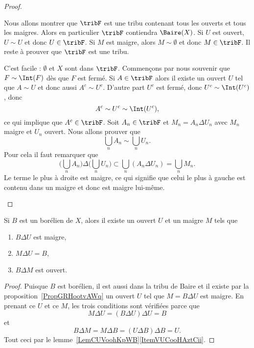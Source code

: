 \begin{proof}
\begin{subproof}
		Nous allons montrer que \( \tribF\) est une tribu contenant tous les ouverts et tous les maigres. Alors en particulier \( \tribF\) contiendra \( \Baire(X)\). Si \( U\) est ouvert, \( U\sim U\) et donc \( U\in\tribF\). Si \( M \) est maigre, alors \( M\sim\emptyset\) et donc \( M\in\tribF\). Il reste à prouver que \( \tribF\) est une tribu.
		\begin{subproof}
			 C'est facile : \( \emptyset\) et \( X\) sont dans \( \tribF\).
			\spitem[Comlémentaire] Commençons par nous souvenir que \( F\sim\Int(F)\) dès que \( F\) est fermé. Si \( A\in\tribF\) alors il existe un ouvert \( U\) tel que \( A\sim U\) et donc aussi \( A^c\sim U^c\). D'autre part \( U^c\) est fermé, donc \( U^c\sim\Int(U^c)\), donc
			\begin{equation}
				A^c\sim U^c\sim\Int(U^c),
			\end{equation}
			ce qui implique que \( A^c\in\tribF\).
			 Soit \( A_n\in\tribF\) et \( M_n=A_n\Delta U_n\) avec \( M_n\) maigre et \( U_n\) ouvert. Nous allons prouver que
			\begin{equation}
				\bigcup_nA_n\sim\bigcup_nU_n.
			\end{equation}
			Pour cela il faut remarquer que
			\begin{equation}
				\Big( \bigcup_nA_n \Big)\Delta\Big( \bigcup_nU_n \Big)\subset\bigcup_n(A_n\Delta U_n)=\bigcup_nM_n.
			\end{equation}
			Le terme le plus à droite est maigre, ce qui signifie que celui le plus à gauche est contenu dans un maigre et donc est maigre lui-même.
		\end{subproof}
	\end{subproof}
\end{proof}

\begin{proposition}
	Si \( B\) est un borélien de \( X\), alors il existe un ouvert \( U\) et un maigre \( M\) tels que
	\begin{enumerate}
		\item
		      \( B\Delta U\) est maigre,
		\item
		      \( M\Delta U=B\),
		\item
		      \( B\Delta M\) est ouvert.
	\end{enumerate}
\end{proposition}

\begin{proof}
	Puisque \( B\) est borélien, il est aussi dans la tribu de Baire et il existe par la proposition~\ref{PropGRHootvAWq} un ouvert \( U\) tel que \( M=B\Delta U\) est maigre. En prenant ce \( U\) et ce \( M\), les trois conditions sont vérifiées parce que
	\begin{equation}
		M\Delta U=(B\Delta U)\Delta U=B
	\end{equation}
	et
	\begin{equation}
		B\Delta M=M\Delta B=(U\Delta B)\Delta B=U.
	\end{equation}
	Tout ceci par le lemme~\ref{LemCUVoohKpWB}\ref{ItemVUCooHAztCii}.
\end{proof}


